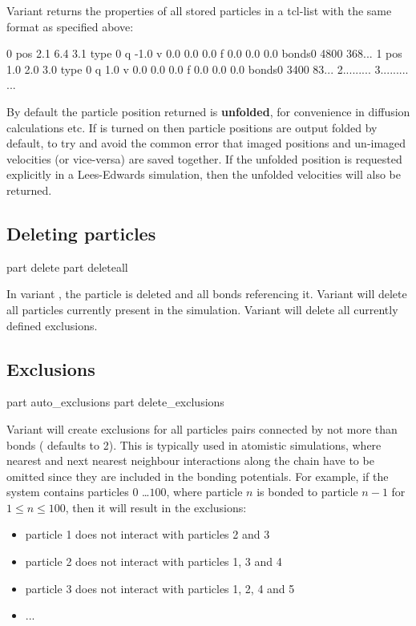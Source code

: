 Variant  returns the properties of all stored particles in
a tcl-list with the same format as specified above:
\begin{tclcode}
{0 pos 2.1 6.4 3.1 type 0 q -1.0 v 0.0 0.0 0.0 f 0.0 0.0 0.0
 bonds{{0 480}{0 368}...}} 
{1 pos 1.0 2.0 3.0 type 0 q 1.0 v 0.0 0.0 0.0 f 0.0 0.0 0.0
 bonds{{0 340}{0 83}...}} 
{2...{{...}...}}
{3...{{...}...}}
...
\end{tclcode}

By default the particle position returned is {\bf unfolded}, for convenience in diffusion calculations etc. 
If  is turned on then particle positions are output folded by default, 
to try and avoid the common error that imaged positions and un-imaged velocities (or vice-versa) are saved together.  
If the unfolded position is requested explicitly in a Lees-Edwards simulation, then the unfolded velocities will also be returned.


\subsection{Deleting  particles}
\label{tcl:part:delete}

\begin{essyntax}
   part  delete
   part deleteall
\end{essyntax}

In variant , the particle  is deleted
and all bonds referencing it.  Variant  will delete all
particles currently present in the simulation. Variant 
will delete all currently defined exclusions.

\subsection{Exclusions}

\begin{essyntax}
   part auto\_exclusions 
   part delete\_exclusions
  \begin{features}
  \end{features}
\end{essyntax}


Variant  will create exclusions for all particles pairs
connected by not more than  bonds ( defaults to
2). This is typically used in atomistic simulations, where nearest and
next nearest neighbour interactions along the chain have to be omitted
since they are included in the bonding potentials. For example, if the
system contains particles $0$ \dots $100$, where particle $n$ is
bonded to particle $n-1$ for $1 \leq n \leq 100$, then it will result
in the exclusions:
\begin{itemize}
  \item particle 1 does not interact with particles 2 and 3
  \item particle 2 does not interact with particles 1, 3 and 4
  \item particle 3 does not interact with particles 1, 2, 4 and 5
  \item ...
\end{itemize}

